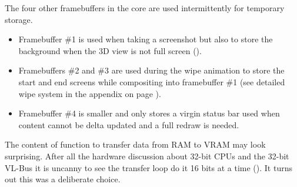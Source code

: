 \par
The four other framebuffers in the core are used intermittently for temporary storage.
\begin{itemize} 
\item Framebuffer \#1 is used when taking a screenshot but also to store the background when the 3D view is not full screen ().

\item Framebuffers \#2 and \#3 are used during the wipe animation to store the start and end screens while compositing into framebuffer \#1 (see detailed wipe system in the appendix on page \pageref{label_melt}). 
\item Framebuffer \#4 is smaller and only stores a virgin status bar used when content cannot be delta updated and a full redraw is needed. 
\end{itemize}
\par



The content of function  to transfer data from RAM to VRAM may look surprising. After all the hardware discussion about 32-bit CPUs and the 32-bit VL-Bus it is uncanny to see the transfer loop do it 16 bits at a time (). It turns out this was a deliberate choice.\\
\par
{}\\
\par
{}
\par
